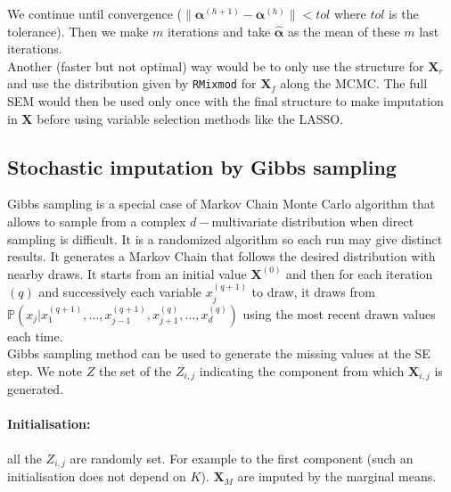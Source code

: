 \documentclass[12pt,a4paper]{report}
\begin{document}
		We continue until convergence ($\parallel \boldsymbol{\alpha}^{(h+1)} - \boldsymbol{\alpha}^{(h)}\parallel < tol $ where $tol$ is the tolerance). Then we make $m$ iterations and take $\hat{\boldsymbol{\alpha}}$ as the mean of these $m$ last iterations.\\
		
		
Another (faster but not optimal) way would be to only use the structure for $\boldsymbol{X}_r$ and use the distribution given by {\tt RMixmod} for $\boldsymbol{X}_f$ along the MCMC. The full SEM would then be used only once with the final structure to make imputation in $\boldsymbol{X}$ before using variable selection methods like the LASSO.


	\subsection{Stochastic imputation by Gibbs sampling}
		Gibbs sampling \cite{casella1992explaining} is a special case of Markov Chain Monte Carlo algorithm \cite{gilks1996markov,chib1995understanding,roberts2001optimal} that allows to sample from a complex $d-$multivariate distribution when direct sampling is difficult. It is a randomized algorithm so each run may give distinct results. It generates a Markov Chain that follows the desired distribution with nearby draws. It starts from an initial value $\boldsymbol{X}^{(0)}$ and then for each iteration $(q)$ and successively each variable $x_j^{(q+1)}$ to draw, it draws from $\mathbb{P}(x_j|x_1^{(q+1)}, \dots,x_{j-1}^{(q+1)},x_{j+1}^{(q)},\dots,x_d^{(q)})$ using the most recent drawn values each time. \\
		Gibbs sampling method can be used to generate the missing values at the SE step. We note $Z$ the set of the $Z_{i,j}$ indicating the component from which $\boldsymbol{X}_{i,j}$ is generated.
		\paragraph{Initialisation:} all the $Z_{i,j}$ are randomly set. For example to the first component (such an initialisation does not depend on $K$). $\boldsymbol{X}_M$ are imputed by the marginal means.
\end{document}
